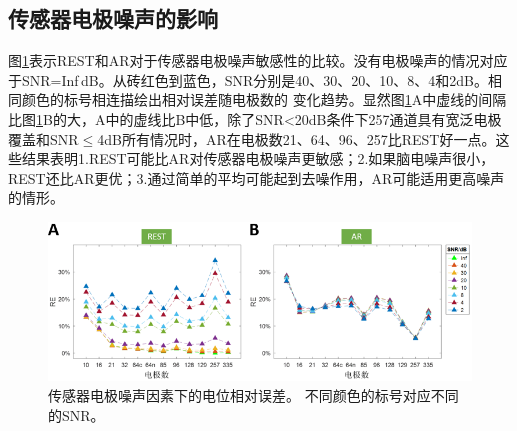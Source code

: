 \subsection{传感器电极噪声的影响}
图\ref{2:noise}表示REST和AR对于传感器电极噪声敏感性的比较。没有电极噪声的情况对应于SNR=Inf$\,$dB。从砖红色到蓝色，SNR分别是40、30、20、10、8、4和2dB。相同颜色的标号相连描绘出相对误差随电极数的
变化趋势。显然图\ref{2:noise}A中虚线的间隔比图\ref{2:noise}B的大，A中的虚线比B中低，除了SNR<20dB条件下257通道具有宽泛电极覆盖和SNR$\leq$4dB所有情况时，AR在电极数21、64、96、257比REST好一点。这些结果表明1.REST可能比AR对传感器电极噪声更敏感；2.如果脑电噪声很小，REST还比AR更优；3.通过简单的平均可能起到去噪作用，AR可能适用更高噪声的情形。
\begin{figure}[h!]
	\centering
	\includegraphics[width=15cm]{pic/JNE/figure8.png}
	\caption{传感器电极噪声因素下的电位相对误差。 不同颜色的标号对应不同的SNR。}
	\label{2:noise}
\end{figure}
